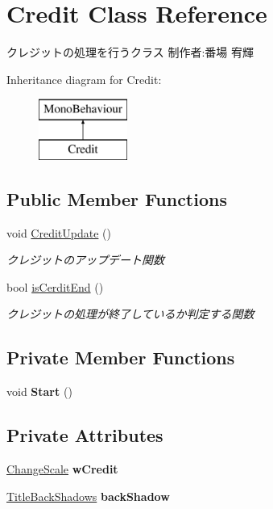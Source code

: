 \hypertarget{class_credit}{}\section{Credit Class Reference}
\label{class_credit}


クレジットの処理を行うクラス 制作者\+:番場 宥輝  


Inheritance diagram for Credit\+:\begin{figure}[H]
\begin{center}
\leavevmode
\includegraphics[height=2.000000cm]{class_credit}
\end{center}
\end{figure}
\subsection*{Public Member Functions}
\begin{DoxyCompactItemize}
\item 
void \hyperlink{class_credit_a57de0ac73f0894b9e902ebb6e4953df9}{Credit\+Update} ()
\begin{DoxyCompactList}\small\item\em クレジットのアップデート関数 \end{DoxyCompactList}\item 
bool \hyperlink{class_credit_aa75f39f86feb5d591836c9f141fca52c}{is\+Cerdit\+End} ()
\begin{DoxyCompactList}\small\item\em クレジットの処理が終了しているか判定する関数 \end{DoxyCompactList}\end{DoxyCompactItemize}
\subsection*{Private Member Functions}
\begin{DoxyCompactItemize}
\item 
\mbox{\label{class_credit_aa4d55ff898bcf13f878f028b38c8efb2}} 
void {\bfseries Start} ()
\end{DoxyCompactItemize}
\subsection*{Private Attributes}
\begin{DoxyCompactItemize}
\item 
\mbox{\label{class_credit_adce60d0f34004a65316a7426dea918d4}} 
\hyperlink{class_change_scale}{Change\+Scale} {\bfseries w\+Credit}
\item 
\mbox{\label{class_credit_af3638bf74c85afe7112a5c490145ca57}} 
\hyperlink{class_title_back_shadows}{Title\+Back\+Shadows} {\bfseries back\+Shadow}
\end{DoxyCompactItemize}


